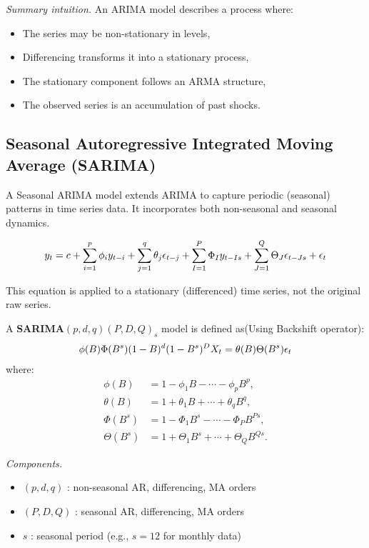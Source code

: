 \documentclass[10pt,a4paper]{article}
\begin{document}
	\textit{Summary intuition.} An ARIMA model describes a process where:
	\begin{itemize}
	\item The series may be non-stationary in levels,
	\item Differencing transforms it into a stationary process,
	\item The stationary component follows an ARMA structure,
	\item The observed series is an accumulation of past shocks.
	\end{itemize}
	
	
	\subsection{Seasonal Autoregressive Integrated Moving Average (SARIMA)}
	
	A Seasonal ARIMA model extends ARIMA to capture periodic (seasonal) patterns in time series data. It incorporates both non-seasonal and seasonal dynamics.
	
	\begin{align*}
	\large y_t = c + \sum_{i=1}^{p} \phi_i y_{t-i} + \sum_{j=1}^{q} \theta_j \epsilon_{t-j} + \sum_{I=1}^{P} \Phi_I y_{t-Is} + \sum_{J=1}^{Q} \Theta_J \epsilon_{t-Js} + \epsilon_t
	\end{align*} 
	
	This equation is applied to a stationary (differenced) time series, not the original raw series.
	
	A \textbf{SARIMA$(p,d,q)(P,D,Q)_s$} model is defined as(Using Backshift operator):
	\begin{align*}
	\large \phi(B)\Phi(B^s)(1 - B)^d (1 - B^s)^D X_t = \theta(B)\Theta(B^s)\epsilon_t
	\end{align*}
	where:
	\begin{align*}
	\phi(B) &= 1 - \phi_1 B - \cdots - \phi_p B^p, \\
	\theta(B) &= 1 + \theta_1 B + \cdots + \theta_q B^q, \\
	\Phi(B^s) &= 1 - \Phi_1 B^s - \cdots - \Phi_P B^{Ps}, \\
	\Theta(B^s) &= 1 + \Theta_1 B^s + \cdots + \Theta_Q B^{Qs}.
	\end{align*}
	
	\textit{Components.}
	\begin{itemize}
	\item $(p,d,q)$ : non-seasonal AR, differencing, MA orders
	\item $(P,D,Q)$ : seasonal AR, differencing, MA orders
	\item $s$ : seasonal period (e.g., $s=12$ for monthly data)
	\end{itemize}
	
\end{document}
